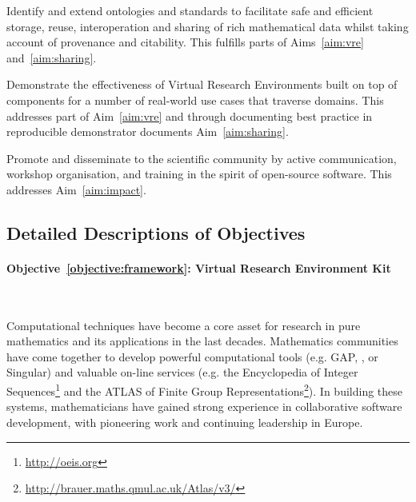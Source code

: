 \documentclass[noworkareas,deliverables,\classoptions]{euproposal}       %
\begin{document}
\begin{proposal}
\begin{compactenum}
\item \label{objective:data} Identify and extend ontologies and
  standards to facilitate safe and efficient storage, reuse,
  interoperation and sharing of rich mathematical data whilst taking
  account of provenance and citability. This fulfills parts of
  Aims~\ref{aim:vre} and~\ref{aim:sharing}.

\item \label{objective:demo} Demonstrate the effectiveness of Virtual
  Research Environments built on top of \TheProject components for a
  number of real-world use cases that traverse domains. This addresses
  part of Aim~\ref{aim:vre} and through documenting best practice in
  reproducible demonstrator documents Aim~\ref{aim:sharing}.

\item \label{objective:disseminate} Promote and disseminate
  \TheProject to the scientific community by active communication,
  workshop organisation, and training in the spirit of open-source
  software. This addresses Aim~\ref{aim:impact}.


\end{compactenum}

\subsection*{Detailed Descriptions of Objectives} %

\paragraph{Objective~\ref{objective:framework}: Virtual Research
  Environment Kit}\

Computational techniques have become a core asset for research in pure
mathematics and its applications in the last decades. Mathematics
communities have come together to develop powerful computational
tools (e.g. GAP, \PariGP, \Sage or Singular) and valuable on-line
services (e.g. the Encyclopedia of Integer Sequences\footnote{\url{http://oeis.org}} and the ATLAS of Finite Group Representations\footnote{
\url{http://brauer.maths.qmul.ac.uk/Atlas/v3/}}). In building these
systems, mathematicians have gained strong experience in collaborative
software development, with pioneering work and continuing leadership
in Europe.


\end{proposal}
\end{document}
